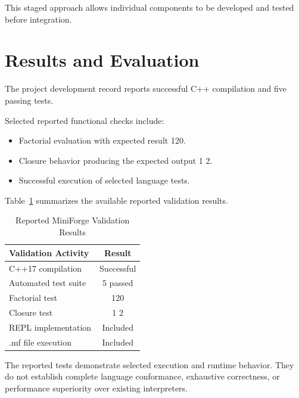 \documentclass[conference]{IEEEtran}
\begin{document}
This staged approach allows individual components
to be developed and tested before integration.

\section{Results and Evaluation}

The project development record reports successful
C++ compilation and five passing tests.

Selected reported functional checks include:

\begin{itemize}
    \item Factorial evaluation with expected result 120.
    \item Closure behavior producing the expected output 1 2.
    \item Successful execution of selected language tests.
\end{itemize}

Table~\ref{tab:results} summarizes the available
reported validation results.

\begin{table}[!t]
\centering
\caption{Reported MiniForge Validation Results}
\label{tab:results}

\begin{tabular}{|p{}|c|}
\hline
\textbf{Validation Activity} & \textbf{Result}\\
\hline
C++17 compilation & Successful\\
\hline
Automated test suite & 5 passed\\
\hline
Factorial test & 120\\
\hline
Closure test & 1 2\\
\hline
REPL implementation & Included\\
\hline
.mf file execution & Included\\
\hline
\end{tabular}
\end{table}

The reported tests demonstrate selected execution
and runtime behavior. They do not establish complete
language conformance, exhaustive correctness, or
performance superiority over existing interpreters.

\end{document}
